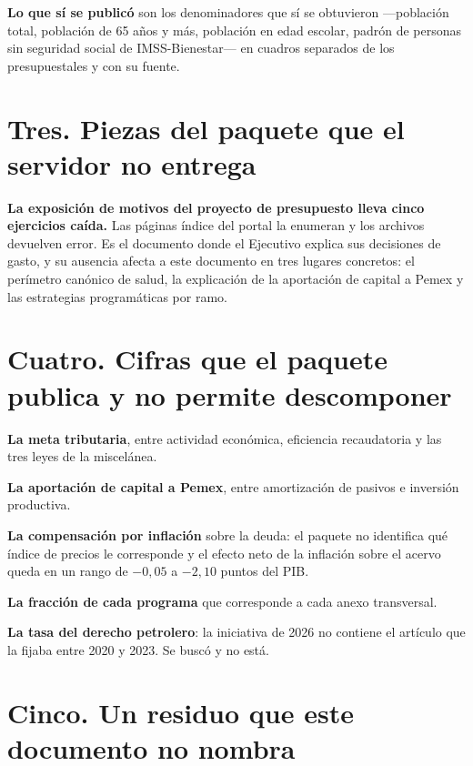 \textbf{Lo que sí se publicó} son los denominadores que sí se obtuvieron ---población total,
población de 65 años y más, población en edad escolar, padrón de personas sin seguridad social
de IMSS-Bienestar--- en cuadros separados de los presupuestales y con su fuente.

\section*{Tres. Piezas del paquete que el servidor no entrega}

\textbf{La exposición de motivos del proyecto de presupuesto lleva cinco ejercicios caída.} Las
páginas índice del portal la enumeran y los archivos devuelven error. Es el documento donde el
Ejecutivo explica sus decisiones de gasto, y su ausencia afecta a este documento en tres
lugares concretos: el perímetro canónico de salud, la explicación de la aportación de capital a
Pemex y las estrategias programáticas por ramo.

\section*{Cuatro. Cifras que el paquete publica y no permite descomponer}

\begin{list}{}{\setlength{\leftmargin}{1.4em}\setlength{\itemsep}{2pt}}
\item[$\bullet$] \textbf{La meta tributaria}, entre actividad económica, eficiencia
recaudatoria y las tres leyes de la miscelánea.
\item[$\bullet$] \textbf{La aportación de capital a Pemex}, entre amortización de pasivos e
inversión productiva.
\item[$\bullet$] \textbf{La compensación por inflación} sobre la deuda: el paquete no
identifica qué índice de precios le corresponde y el efecto neto de la inflación sobre el
acervo queda en un rango de $-0,05$ a $-2,10$ puntos del PIB.
\item[$\bullet$] \textbf{La fracción de cada programa} que corresponde a cada anexo
transversal.
\item[$\bullet$] \textbf{La tasa del derecho petrolero}: la iniciativa de 2026 no contiene el
artículo que la fijaba entre 2020 y 2023. Se buscó y no está.
\end{list}

\section*{Cinco. Un residuo que este documento no nombra}

